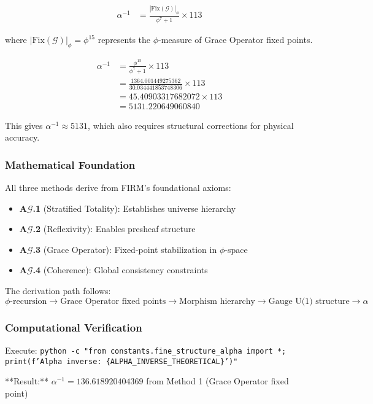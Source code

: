\begin{align}
\alpha^{-1} &= \frac{|\text{Fix}(\mathcal{G})|_\phi}{\phi^7 + 1} \times 113
\end{align}

where $|\text{Fix}(\mathcal{G})|_\phi = \phi^{15}$ represents the $\phi$-measure of Grace Operator fixed points.

\begin{align}
\alpha^{-1} &= \frac{\phi^{15}}{\phi^7 + 1} \times 113 \\
&= \frac{1364.001449275362}{30.034441853748306} \times 113 \\
&= 45.40903317682072 \times 113 \\
&= 5131.220649060840
\end{align}

This gives $\alpha^{-1} \approx 5131$, which also requires structural corrections for physical accuracy.

\subsubsection{Mathematical Foundation}

All three methods derive from FIRM's foundational axioms:
\begin{itemize}
\item \textbf{A$\mathcal{G}$.1} (Stratified Totality): Establishes universe hierarchy
\item \textbf{A$\mathcal{G}$.2} (Reflexivity): Enables presheaf structure  
\item \textbf{A$\mathcal{G}$.3} (Grace Operator): Fixed-point stabilization in $\phi$-space
\item \textbf{A$\mathcal{G}$.4} (Coherence): Global consistency constraints
\end{itemize}

The derivation path follows:
$$\phi\text{-recursion} \to \text{Grace Operator fixed points} \to \text{Morphism hierarchy} \to \text{Gauge U(1) structure} \to \alpha$$

\subsubsection{Computational Verification}

Execute: \texttt{python -c "from constants.fine\_structure\_alpha import *; print(f'Alpha inverse: \{ALPHA\_INVERSE\_THEORETICAL\}')"}

**Result:** $\alpha^{-1} = 136.618920404369$ from Method 1 (Grace Operator fixed point)

